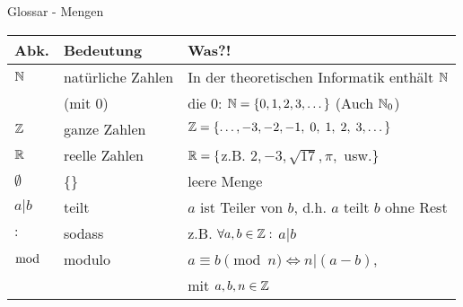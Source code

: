 %
%
%
%

\begin{frame}[fragile]{Glossar - Mengen}
    \small
    \begin{tabular}{p{} p{} p{}}
        \toprule
        Abk.        & Bedeutung         & Was?!                                                       \\
        \midrule
        $\mathbb{N}$ & natürliche Zahlen & In der theoretischen Informatik enthält $\mathbb{N}$         \\
                    & (mit $0$)         & die $0$: $\mathbb{N}=\{0,1,2,3,\dots\}$ (Auch $\mathbb{N}_0$) \\
        $\mathbb{Z}$ & ganze Zahlen      & $\mathbb{Z}=\{\dots,-3,-2,-1,\;0,\;1,\;2,\;3,\dots\}$        \\
        $\mathbb{R}$    & reelle Zahlen     & $\mathbb{R}=\{$z.B. $ 2,-3,\sqrt{17},\pi,$ usw.$\}$             \\
        $\emptyset$ & \{\}              & leere Menge                                                 \\
        $a|b$       & teilt             & $a$ ist Teiler von $b$, d.h. $a$ teilt $b$ ohne Rest        \\
        $:$         & sodass            & z.B. $\forall a,b\in\mathbb{Z}:$ $a|b$                       \\
        $\bmod$     & modulo            & $a\equiv b \pmod n \iff n|(a-b)$,                           \\
                    &                   & mit $a,b,n\in\mathbb{Z}$                                     \\
        \bottomrule
    \end{tabular}
\end{frame}